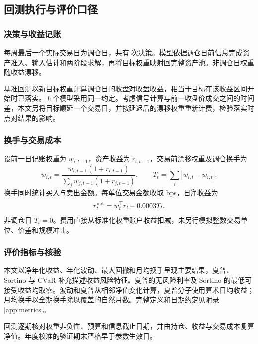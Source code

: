 \subsection{回测执行与评价口径}
\subsubsection{决策与收益记账}
每周最后一个实际交易日为调仓日，共有 \primaryRebalances{} 次决策。模型依据调仓日前信息完成资产准入、输入估计和两阶段求解，再将目标权重映射回完整资产池。非调仓日权重随收益漂移。

基准回测以新目标权重计算调仓日的收盘对收盘收益，相当于目标在该收益区间开始时已落实。五个模型采用同一约定。考虑信号计算与前一收盘价成交之间的时间差，本文另将目标顺延一个交易日，并按延迟后的漂移权重重新计费，检验落实时点对结果的影响。

\subsubsection{换手与交易成本}
设前一日记账权重为 $w_{i,t-1}$，资产收益为 $r_{i,t-1}$，交易前漂移权重及调仓换手为
\[
w^-_{i,t}=\frac{w_{i,t-1}(1+r_{i,t-1})}{\sum_jw_{j,t-1}(1+r_{j,t-1})},
\qquad T_t=\sum_i|w_{i,t}-w^-_{i,t}|.
\]
换手同时统计买入与卖出金额。每单位交易金额收取 \txCostBps{} bps，日净收益为
\[
r_t^{\rm net}=w_t^\mathsf T r_t-0.0003T_t.
\]
非调仓日 $T_t=0$。费用直接从标准化权重账户收益扣减，未另行模拟整数交易单位、价差和规模冲击。

\subsubsection{评价指标与核验}
本文以净年化收益、年化波动、最大回撤和月均换手呈现主要结果，夏普、Sortino 与 CVaR 补充描述收益风险特征。夏普的无风险利率及 Sortino 的最低可接受收益均取零。波动和夏普从相邻净值变化计算，夏普分子使用算术日均收益；月均换手以全期换手除以覆盖的自然月数。完整定义和日期约定见附录\ref{app:metrics}。

回测逐期核对权重非负性、预算和信息截止日期，并由持仓、收益与交易成本复算净值。年度校准的验证期末严格早于参数生效日。
